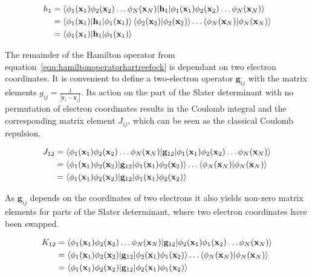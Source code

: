 \begin{align}
    \begin{aligned}
        h_1&=\braket{\phi_1(\mathbf{x}_1)\phi_2(\mathbf{x}_2)\ldots\phi_N(\mathbf{x}_N)|\mathbf{h}_1|\phi_1(\mathbf{x}_1)\phi_2(\mathbf{x}_2)\ldots\phi_N(\mathbf{x}_N)}\\
        &=\braket{\phi_1(\mathbf{x}_1)|\mathbf{h}_1|\phi_1(\mathbf{x}_1)}\braket{\phi_2(\mathbf{x}_2)|\phi_2(\mathbf{x}_2)}\ldots\braket{\phi_N(\mathbf{x}_N)|\phi_N(\mathbf{x}_N)} \\
        &=\braket{\phi_1(\mathbf{x}_1)|\mathbf{h}_1|\phi_1(\mathbf{x}_1)}
    \end{aligned}
\end{align}

The remainder of the Hamilton operator from
equation~\eqref{eqn:hamiltonoperatorhartreefock} is dependant on two electron
coordinates. It is convenient to define a two-electron operator $\mathbf{g}_{ij}$
with the matrix elements $g_{ij}=\frac{1}{|\mathbf{r}_i-\mathbf{r}_j|}$. Its
action on the part of the Slater determinant with no permutation of electron
coordinates results in the Coulomb integral and the corresponding matrix
element $J_{ij}$, which can be seen as the classical Coulomb repulsion.

\begin{align}
    \begin{aligned}
        J_{12}&=\braket{\phi_1(\mathbf{x}_1)\phi_2(\mathbf{x}_2)\ldots\phi_N(\mathbf{x}_N)|\mathbf{g}_{12}|\phi_1(\mathbf{x}_1)\phi_2(\mathbf{x}_2)\ldots\phi_N(\mathbf{x}_N)}\\
        &=\braket{\phi_1(\mathbf{x}_1)\phi_2(\mathbf{x}_2)|\mathbf{g}_{12}|\phi_1(\mathbf{x}_1)\phi_2(\mathbf{x}_2)}\ldots\braket{\phi_N(\mathbf{x}_N)|\phi_N(\mathbf{x}_N)} \\
        &=\braket{\phi_1(\mathbf{x}_1)\phi_2(\mathbf{x}_2)|\mathbf{g}_{12}|\phi_1(\mathbf{x}_1)\phi_2(\mathbf{x}_2)}
    \end{aligned}
\end{align}

As $\mathbf{g}_{ij}$ depends on the coordinates of two electrons it also yields
non-zero matrix elements for parts of the Slater determinant, where two
electron coordinates have been swapped.

\begin{align}
    \begin{aligned}
        K_{12}&=\braket{\phi_1(\mathbf{x}_1)\phi_2(\mathbf{x}_2)\ldots\phi_N(\mathbf{x}_N)|\mathbf{g}_{12}|\phi_2(\mathbf{x}_1)\phi_1(\mathbf{x}_2)\ldots\phi_N(\mathbf{x}_N)}\\
        &=\braket{\phi_1(\mathbf{x}_1)\phi_2(\mathbf{x}_2)|\mathbf{g}_{12}|\phi_2(\mathbf{x}_1)\phi_1(\mathbf{x}_2)}\ldots\braket{\phi_N(\mathbf{x}_N)|\phi_N(\mathbf{x}_N)} \\
        &=\braket{\phi_1(\mathbf{x}_1)\phi_2(\mathbf{x}_2)|\mathbf{g}_{12}|\phi_2(\mathbf{x}_1)\phi_1(\mathbf{x}_2)}
    \end{aligned}
\end{align}

